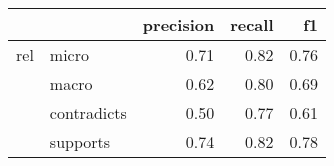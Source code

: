 \begin{tabular}{llrrr}
\toprule
    &          &  precision &  recall &   f1 \\
\midrule
rel & micro &       0.71 &    0.82 & 0.76 \\
    & macro &       0.62 &    0.80 & 0.69 \\
    & contradicts &       0.50 &    0.77 & 0.61 \\
    & supports &       0.74 &    0.82 & 0.78 \\
\bottomrule
\end{tabular}
